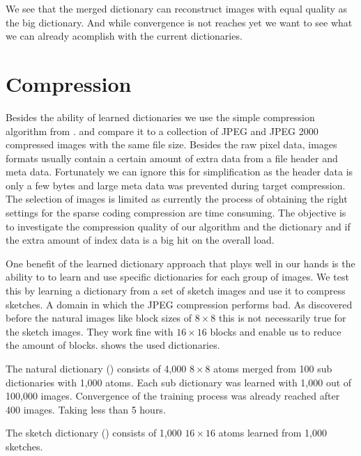 We see that the merged dictionary can reconstruct images with equal quality
as the big dictionary. And while convergence is not reaches yet we want to see
what we can already acomplish with the current dictionaries.


\clearpage
\section{Compression}
Besides the ability of learned dictionaries 
we use the simple compression algorithm from .
and compare it to a collection of JPEG and JPEG 2000 compressed images with the
same file size. Besides the raw pixel data, images formats usually contain a
certain amount of extra data from a file header and meta data. Fortunately we
can ignore this for simplification as the header data is only a few bytes and
large meta data was prevented during target compression. The selection of
images is limited as currently the process of obtaining the right settings for
the sparse coding compression are time consuming.
The objective is to investigate the compression quality of our algorithm and
the dictionary and if the extra amount of index data is a big hit on the overall
load.

One benefit of the learned dictionary approach that plays well in our
hands is the ability to to learn and use specific dictionaries for each group of
images. We test this by learning a dictionary from a set of sketch images and
use it to compress sketches. A domain in which the JPEG compression performs
bad. As discovered before the natural images like block sizes of $8\times 8$
this is not necessarily true for the sketch images. They work fine with
$16\times 16$ blocks and enable us to reduce the amount of blocks.
 shows the used dictionaries. 

The natural dictionary () consists of 4,000 $8 \times
8$ atoms merged from 100 sub dictionaries with 1,000 atoms. Each sub
dictionary was learned with 1,000 out of 100,000 images. Convergence of the
training process was already reached after 400 images. Taking less than 5
hours.

The sketch dictionary () consists of 1,000
$16\times 16$ atoms learned from 1,000 sketches.


